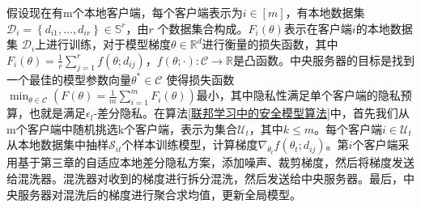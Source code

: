 假设现在有m个本地客户端，每个客户端表示为$i \in[m]$，有本地数据集\\$\mathcal{D}_{i}=\left\{d_{i 1}, \ldots, d_{i r}\right\} \in \mathbb{S}^{r}$，由$r$ 个数据集合构成。$F_{i}(\theta)$表示在客户端$i$的本地数据集 $\mathcal{D}_{i}$上进行训练，对于模型梯度$\theta \in \mathbb{R}^{d}$进行衡量的损失函数，其中$F_{i}(\theta)=\frac{1}{r} \sum_{j=1}^{r} f\left(\theta ; d_{i j}\right)$，$f(\theta ; \cdot): \mathcal{C} \rightarrow \mathbb{R}$是凸函数。中央服务器的目标是找到一个最佳的模型参数向量$\theta^{*} \in \mathcal{C}$ 使得损失函数$\min _{\theta \in \mathcal{C}}\left(F(\theta)=\frac{1}{m} \sum_{i=1}^{m} F_{i}(\theta)\right)$最小，其中隐私性满足单个客户端的隐私预算，也就是满足$\epsilon_{l}$-差分隐私。在算法\ref{联邦学习中的安全模型算法}中，首先我们从m个客户端中随机挑选k个客户端，表示为集合$\mathcal{U}_{t}$，其中$k \leq m$。每个客户端$i \in \mathcal{U}_{t}$从本地数据集中抽样$\mathcal{S}_{i t}$个样本训练模型，计算梯度$\nabla_{\theta_{t}} f\left(\theta_{t} ; d_{i j}\right)$。第$i$个客户端采用基于第三章的自适应本地差分隐私方案，添加噪声、裁剪梯度，然后将梯度发送给混洗器。混洗器对收到的梯度进行拆分混洗，然后发送给中央服务器。最后，中央服务器对混洗后的梯度进行聚合求均值，更新全局模型。


